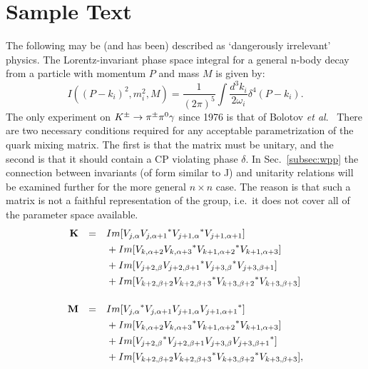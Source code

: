 \documentclass{ws-p8-50x6-00}
\begin{document}
\section{Sample Text}
The following may be (and has been) described as `dangerously irrelevant'
physics. The Lorentz-invariant phase space integral for
a general n-body decay from a particle with momentum $P$
and mass $M$ is given by:
\begin{equation}
I((P - k_i)^2, m^2_i, M) = \frac{1}{(2 \pi)^5}\!
\int\!\frac{d^3 k_i}{2 \omega_i} \! \delta^4(P - k_i).
\label{eq:murnf}
\end{equation}
The only experiment on $K^{\pm} \rightarrow \pi^{\pm} \pi^0 \gamma$ since 1976
is that of Bolotov {\it et al}.~\cite{bu} 
There are two necessary conditions required for any acceptable 
parametrization of the quark mixing matrix. The first is that
the matrix must be unitary, and the second is that it should
contain a CP violating phase $\delta$. In Sec.~\ref{subsec:wpp}
the connection between invariants (of form similar to J) and
unitarity relations will be examined further for the more
general $ n \times n $ case. The reason is that such a matrix is
not a faithful representation of the group, i.e.~it does not
cover all of the parameter space available. 
\begin{equation}
\begin{array}{rcl}
\bf{K} & = &  Im[V_{j, \alpha} {V_{j,\alpha + 1}}^*
{V_{j + 1,\alpha}}^* V_{j + 1, \alpha + 1} ] \\[4pt]
&&{}+ Im[V_{k, \alpha + 2} {V_{k,\alpha + 3}}^*
{V_{k + 1,\alpha + 2}}^* V_{k + 1, \alpha + 3} ]  \\[4pt]
&&{}+ Im[V_{j + 2, \beta} {V_{j + 2,\beta + 1}}^*
{V_{j + 3,\beta}}^* V_{j + 3, \beta + 1} ]  \\[4pt]
&&{}+ Im[V_{k + 2, \beta + 2} {V_{k + 2,\beta + 3}}^*
{V_{k + 3,\beta + 2}}^* V_{k + 3, \beta + 3}] \\[4pt]
& & \\
\bf{M} & = &  Im[{V_{j, \alpha}}^* V_{j,\alpha + 1}
V_{j + 1,\alpha} {V_{j + 1, \alpha + 1}}^* ]  \\[4pt]
&&{}+ Im[V_{k, \alpha + 2} {V_{k,\alpha + 3}}^*
{V_{k + 1,\alpha + 2}}^* V_{k + 1, \alpha + 3} ]  \\[4pt]
&&{}+ Im[{V_{j + 2, \beta}}^* V_{j + 2,\beta + 1}
V_{j + 3,\beta} {V_{j + 3, \beta + 1}}^* ]  \\[4pt]
&&{}+ Im[V_{k + 2, \beta + 2} {V_{k + 2,\beta + 3}}^*
{V_{k + 3,\beta + 2}}^* V_{k + 3, \beta + 3}],
\\ & &
\end{array}\label{eq:spa}
\end{equation}
\end{document}
